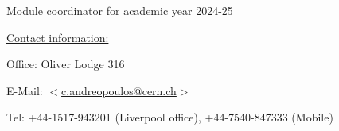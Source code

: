 \begin{frame}{Module coordinator for academic year 2024-25}
\vspace{0.6cm}
  
\underline{Contact information:}\\
\vspace{0.2cm}
\begin{itemize}
{\small
 \item Office: Oliver Lodge 316
 \item E-Mail: $<$\href{mailto:c.andreopoulos@cern.ch}{c.andreopoulos@cern.ch}$>$
 \item Tel: +44-1517-943201 (Liverpool office), +44-7540-847333 (Mobile)
}
\end{itemize}
  
\end{frame}

